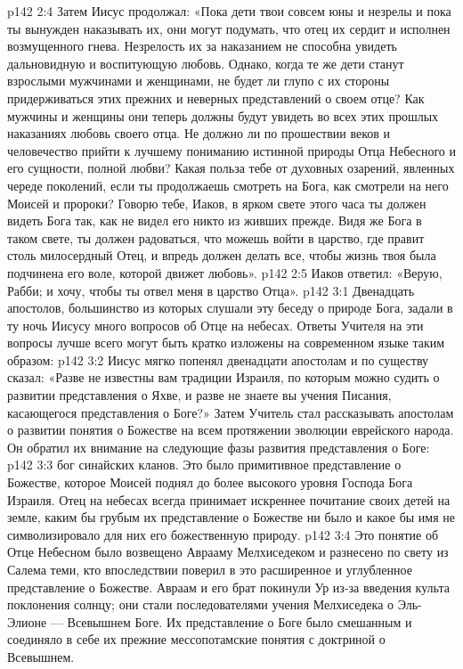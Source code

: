 \vs p142 2:4 \pc Затем Иисус продолжал: «Пока дети твои совсем юны и незрелы и пока ты вынужден наказывать их, они могут подумать, что отец их сердит и исполнен возмущенного гнева. Незрелость их за наказанием не способна увидеть дальновидную и воспитующую любовь. Однако, когда те же дети станут взрослыми мужчинами и женщинами, не будет ли глупо с их стороны придерживаться этих прежних и неверных представлений о своем отце? Как мужчины и женщины они теперь должны будут увидеть во всех этих прошлых наказаниях любовь своего отца. Не должно ли по прошествии веков и человечество прийти к лучшему пониманию истинной природы Отца Небесного и его сущности, полной любви? Какая польза тебе от духовных озарений, явленных череде поколений, если ты продолжаешь смотреть на Бога, как смотрели на него Моисей и пророки? Говорю тебе, Иаков, в ярком свете этого часа ты должен видеть Бога так, как не видел его никто из живших прежде. Видя же Бога в таком свете, ты должен радоваться, что можешь войти в царство, где правит столь милосердный Отец, и впредь должен делать все, чтобы жизнь твоя была подчинена его воле, которой движет любовь».
\vs p142 2:5 Иаков ответил: «Верую, Рабби; и хочу, чтобы ты отвел меня в царство Отца».
\vs p142 3:1 Двенадцать апостолов, большинство из которых слушали эту беседу о природе Бога, задали в ту ночь Иисусу много вопросов об Отце на небесах. Ответы Учителя на эти вопросы лучше всего могут быть кратко изложены на современном языке таким образом:
\vs p142 3:2 Иисус мягко попенял двенадцати апостолам и по существу сказал: «Разве не известны вам традиции Израиля, по которым можно судить о развитии представления о Яхве, и разве не знаете вы учения Писания, касающегося представления о Боге?» Затем Учитель стал рассказывать апостолам о развитии понятия о Божестве на всем протяжении эволюции еврейского народа. Он обратил их внимание на следующие фазы развития представления о Боге:
\vs p142 3:3 \bibnobreakspace {} бог синайских кланов. Это было примитивное представление о Божестве, которое Моисей поднял до более высокого уровня Господа Бога Израиля. Отец на небесах всегда принимает искреннее почитание своих детей на земле, каким бы грубым их представление о Божестве ни было и какое бы имя не символизировало для них его божественную природу.
\vs p142 3:4 \pc {}\bibnobreakspace {} Это понятие об Отце Небесном было возвещено Аврааму Мелхиседеком и разнесено по свету из Салема теми, кто впоследствии поверил в это расширенное и углубленное представление о Божестве. Авраам и его брат покинули Ур из\hyp{}за введения культа поклонения солнцу; они стали последователями учения Мелхиседека о Эль\hyp{}Элионе --- Всевышнем Боге. Их представление о Боге было смешанным и соединяло в себе их прежние мессопотамские понятия с доктриной о Всевышнем.
